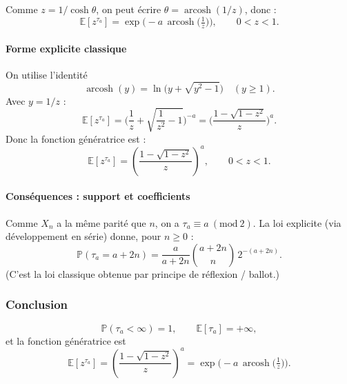 Comme $z=1/\cosh\theta$, on peut écrire $\theta=\operatorname{arcosh}(1/z)$, donc :
\[
\boxed{
\mathbb{E}[z^{\tau_a}]
=\exp\!\Big(-a\,\operatorname{arcosh}\!\big(\tfrac{1}{z}\big)\Big),
\qquad 0<z<1.
}
\]

\paragraph{Forme explicite classique}
On utilise l'identité
\[
\operatorname{arcosh}(y)=\ln\big(y+\sqrt{y^2-1}\big)\quad (y\ge 1).
\]
Avec $y=1/z$ :
\[
\mathbb{E}[z^{\tau_a}]
=\Big(\frac{1}{z}+\sqrt{\frac{1}{z^2}-1}\Big)^{-a}
=\Big(\frac{1-\sqrt{1-z^2}}{z}\Big)^{a}.
\]
Donc la fonction génératrice est :
\[
\boxed{
\mathbb{E}[z^{\tau_a}]
=\left(\frac{1-\sqrt{1-z^2}}{z}\right)^{a},
\qquad 0<z<1.
}
\]

\paragraph{Conséquences : support et coefficients}
Comme $X_n$ a la même parité que $n$, on a $\tau_a\equiv a\ (\mathrm{mod}\ 2)$.
La loi explicite (via développement en série) donne, pour $n\ge 0$ :
\[
\boxed{
\mathbb{P}(\tau_a=a+2n)=\frac{a}{a+2n}\binom{a+2n}{n}\,2^{-(a+2n)}.
}
\]
(C'est la loi classique obtenue par principe de réflexion / ballot.)

\subsubsection*{Conclusion}
\[
\boxed{\mathbb{P}(\tau_a<\infty)=1,\qquad \mathbb{E}[\tau_a]=+\infty,}
\]
et la fonction génératrice est
\[
\boxed{
\mathbb{E}[z^{\tau_a}]
=\left(\frac{1-\sqrt{1-z^2}}{z}\right)^{a}
=\exp\!\Big(-a\,\operatorname{arcosh}\!\big(\tfrac{1}{z}\big)\Big).
}
\]
